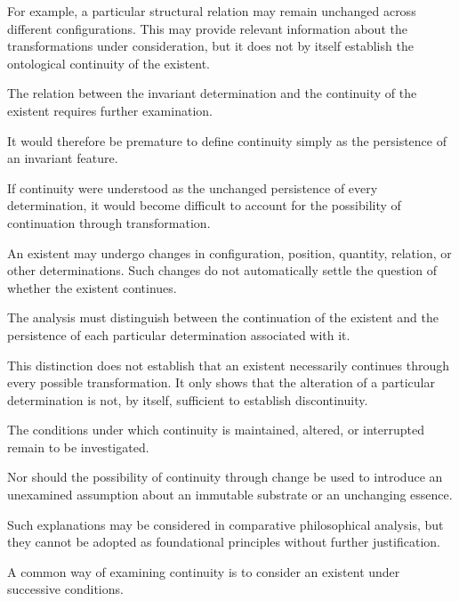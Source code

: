 For example, a particular structural relation
may remain unchanged across different
configurations. This may provide relevant
information about the transformations under
consideration, but it does not by itself
establish the ontological continuity of the
existent.

The relation between the invariant
determination and the continuity of the
existent requires further examination.

It would therefore be premature to define
continuity simply as the persistence of an
invariant feature.


If continuity were understood as the
unchanged persistence of every determination,
it would become difficult to account for
the possibility of continuation through
transformation.

An existent may undergo changes in
configuration, position, quantity, relation,
or other determinations. Such changes do
not automatically settle the question
of whether the existent continues.

The analysis must distinguish between
the continuation of the existent and
the persistence of each particular
determination associated with it.

This distinction does not establish that
an existent necessarily continues through
every possible transformation. It only
shows that the alteration of a particular
determination is not, by itself, sufficient
to establish discontinuity.

The conditions under which continuity
is maintained, altered, or interrupted
remain to be investigated.

Nor should the possibility of continuity
through change be used to introduce an
unexamined assumption about an immutable
substrate or an unchanging essence.

Such explanations may be considered in
comparative philosophical analysis, but
they cannot be adopted as foundational
principles without further justification.


A common way of examining continuity is
to consider an existent under successive
conditions.

